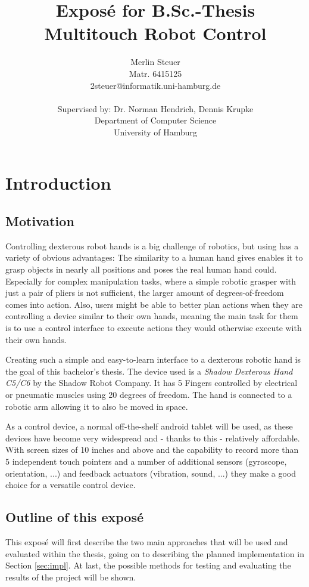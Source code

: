 \documentclass[a4paper]{article}
\title{Exposé for B.Sc.-Thesis \\
Multitouch Robot Control}
\author{Merlin Steuer \\ Matr. 6415125 \\ 2steuer@informatik.uni-hamburg.de \\
\\ Supervised by: Dr. Norman Hendrich, Dennis Krupke \\ 
Department of Computer Science \\ 
University of Hamburg}
\begin{document}
\maketitle

\tableofcontents

\pagebreak

\section{Introduction}
\subsection{Motivation}
Controlling dexterous robot hands is a big challenge of robotics, but using has a variety of obvious advantages: The similarity to a human hand gives enables it to grasp objects in nearly all positions and poses the real human hand could. Especially for complex manipulation tasks, where a simple robotic grasper with just a pair of pliers is not sufficient, the larger amount of degrees-of-freedom comes into action. Also, users might be able to better plan actions when they are controlling a device similar to their own hands, meaning the main task for them is to use a control interface to execute actions they would otherwise execute with their own hands.

Creating such a simple and easy-to-learn interface to a dexterous robotic hand is the goal of this bachelor's thesis. The device used is a \textit{Shadow Dexterous Hand C5/C6} by the Shadow Robot Company. It has 5 Fingers controlled by electrical or pneumatic muscles using 20 degrees of freedom\cite{web/robothand/spec}. The hand is connected to a robotic arm allowing it to also be moved in space.

As a control device, a normal off-the-shelf android tablet will be used, as these devices have become very widespread and - thanks to this - relatively affordable. With screen sizes of 10 inches and above and the capability to record more than 5 independent touch pointers and a number of additional sensors (gyroscope, orientation, ...) and feedback actuators (vibration, sound, ...) they make a good choice for a versatile control device.

\subsection{Outline of this exposé}

This exposé will first describe the two main approaches that will be used and evaluated within the thesis, going on to describing the planned implementation in Section \ref{sec:impl}. At last, the possible methods for testing and evaluating the results of the project will be shown.
\end{document}
